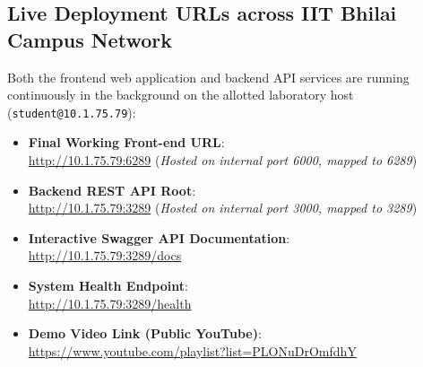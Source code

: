 \documentclass[manuscript,screen,nonacm]{acmart}
\begin{document}
\subsection{Live Deployment URLs across IIT Bhilai Campus Network}
Both the frontend web application and backend API services are running continuously in the background on the allotted laboratory host (\texttt{student@10.1.75.79}):
\begin{itemize}
    \item \textbf{Final Working Front-end URL}: \\
    \url{http://10.1.75.79:6289} \quad (\textit{Hosted on internal port 6000, mapped to 6289})
    \item \textbf{Backend REST API Root}: \\
    \url{http://10.1.75.79:3289} \quad (\textit{Hosted on internal port 3000, mapped to 3289})
    \item \textbf{Interactive Swagger API Documentation}: \\
    \url{http://10.1.75.79:3289/docs}
    \item \textbf{System Health Endpoint}: \\
    \url{http://10.1.75.79:3289/health}
    \item \textbf{Demo Video Link (Public YouTube)}: \\
    \url{https://www.youtube.com/playlist?list=PLONuDrOmfdhY}
\end{itemize}
\end{document}
